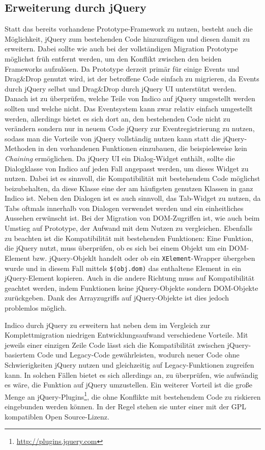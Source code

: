 \subsection{Erweiterung durch jQuery}
Statt das bereits vorhandene Prototype-Framework zu nutzen, besteht auch die Möglichkeit, jQuery zum
bestehenden Code hinzuzufügen und diesen damit zu erweitern. Dabei sollte wie auch bei der
vollständigen Migration Prototype möglichst früh entfernt werden, um den Konflikt zwischen den
beiden Frameworks aufzulösen. Da Prototype derzeit primär für einige Events und Drag\&Drop genutzt
wird, ist der betroffene Code einfach zu migrieren, da Events durch jQuery selbst und Drag\&Drop
durch jQuery UI unterstützt werden. Danach ist zu überprüfen, welche Teile von Indico auf jQuery
umgestellt werden sollten und welche nicht. Das Eventsystem kann zwar relativ einfach umgestellt
werden, allerdings bietet es sich dort an, den bestehenden Code nicht zu verändern sondern nur in
neuem Code jQuery zur Eventregistrierung zu nutzen, sodass man die Vorteile von jQuery vollständig
nutzen kann statt die jQuery-Methoden in den vorhandenen Funktionen einzubauen, die beispielsweise
kein \emph{Chaining} ermöglichen. Da jQuery UI ein Dialog-Widget enthält, sollte die Dialogklasse von
Indico auf jeden Fall angepasst werden, um dieses Widget zu nutzen. Dabei ist es sinnvoll, die
Kompatibilität mit bestehendem Code möglichst beizubehalten, da diese Klasse eine der am häufigsten
genutzen Klassen in ganz Indico ist. Neben den Dialogen ist es auch sinnvoll, das Tab-Widget zu
nutzen, da Tabs oftmals innerhalb von Dialogen verwendet werden und ein einheitliches Aussehen
erwünscht ist. Bei der Migration von DOM-Zugriffen ist, wie auch beim Umstieg auf Prototype, der
Aufwand mit dem Nutzen zu vergleichen. Ebenfalls zu beachten ist die Kompatibilität mit bestehenden
Funktionen: Eine Funktion, die jQuery nutzt, muss überprüfen, ob es sich bei einem Objekt um ein
DOM-Element bzw. jQuery-Objeklt handelt oder ob ein \lstinline{XElement}-Wrapper übergeben wurde und
in diesem Fall mittels \lstinline{$(obj.dom)} das enthaltene Element in ein jQuery-Element
kopieren. Auch in die andere Richtung muss auf Kompatibilität geachtet werden, indem Funktionen keine
jQuery-Objekte sondern DOM-Objekte zurückgeben. Dank des Arrayzugriffs auf jQuery-Objekte ist dies
jedoch problemlos möglich.

Indico durch jQuery zu erweitern hat neben dem im Vergleich zur Komplettmigration niedrigen
Entwicklungsaufwand verschiedene Vorteile. Mit jeweils einer einzigen Zeile Code lässt sich die
Kompatibilität zwischen jQuery-basiertem Code und Legacy-Code gewährleisten, wodurch neuer Code ohne
Schwierigkeiten jQuery nutzen und gleichzeitig auf Legacy-Funktionen zugreifen kann. In solchen
Fällen bietet es sich allerdings an, zu überprüfen, wie aufwändig es wäre, die Funktion auf jQuery
umzustellen. Ein weiterer Vorteil ist die große Menge an
jQuery-Plugins\footnote{\href{http://plugins.jquery.com}{http://plugins.jquery.com}}, die ohne
Konflikte mit bestehendem Code zu riskieren eingebunden werden können. In der Regel stehen sie
unter einer mit der GPL kompatiblen Open Source-Lizenz.



